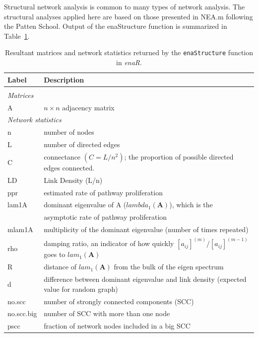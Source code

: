 \documentclass[article]{jss}
\begin{document}
Structural network analysis is common to many types of network
analysis.  The structural analyses applied here are based on those
presented in NEA.m \citep{fath06} following the Patten School.  Output
of the enaStructure function is summarized in
Table~\ref{tab:structure}.

\begin{table}[h]
  \caption{Resultant matrices and network statistics returned by the
    \texttt{enaStructure} function in \textit{enaR}.}\label{tab:structure}
\center
\begin{small}
  \begin{tabularx}{\textwidth}{l l}
    \textbf{Label} & \textbf{Description} \\ \hline \\[-2ex]
    \multicolumn{2}{l}{\textit{Matrices}} \\
    A & $n \times n$ adjacency matrix\\  [1ex]
    \multicolumn{2}{l}{\textit{Network statistics}} \\
    n & number of nodes \\
    L & number of directed edges \\
    C & connectance $(C = L/n^2)$; the proportion of possible directed
    edges connected.\\
    LD & Link Density (L/n) \\
    ppr & estimated rate of pathway proliferation \citep{borrett03} \\
    lam1A & dominant eigenvalue of A ($lambda_1(\mathbf{A})$), which is the \\
    & asymptotic rate of pathway proliferation \citep{borrett07_jtb}\\
    mlam1A & multiplicity of the dominant eigenvalue (number of
    times repeated) \\
    rho & damping ratio, an indicator of how quickly
    $[a_{ij}]^{(m)}/[a_{ij}]^{(m-1)}$ goes to $lam_1(\mathbf{A})$ \citep[][, p. 95]{caswell01} \\
    R & distance of $lam_1(\mathbf{A})$ from the bulk of the eigen spectrum \citep{farkas2001spectra}\\
    d & difference between dominant eigenvalue and link density
    (expected value for random graph) \\
    no.scc & number of strongly connected components (SCC) \\
    no.scc.big & number of SCC with more than one node \\
    pscc & fraction of network nodes included in a big SCC\\
    \hline
  \end{tabularx}
\end{small}
\end{table}
\end{document}
